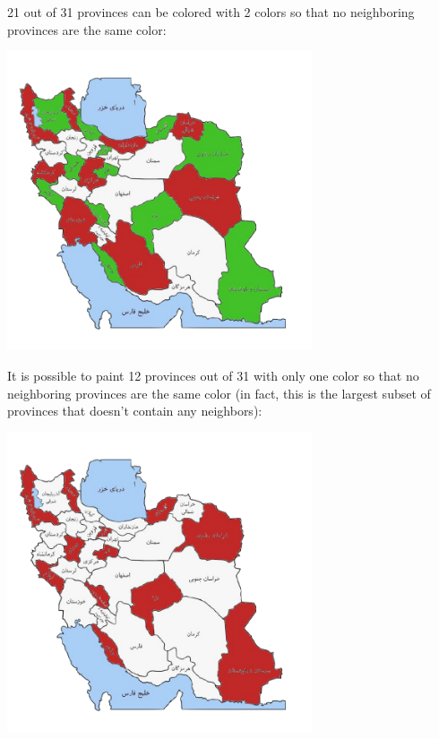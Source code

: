 \begin{solution}
21 out of 31 provinces can be colored with 2 colors so that no neighboring provinces are the same color:

\begin{center}
	\includegraphics[width=9cm]{43/figs/43_sol3.png}
\end{center}

It is possible to paint 12 provinces out of 31 with only one color so that no neighboring provinces are the same color (in fact, this is the largest subset of provinces that doesn't contain any neighbors):

\begin{center}
	\includegraphics[width=9cm]{43/figs/43_sol4.png}
\end{center}

\end{solution}